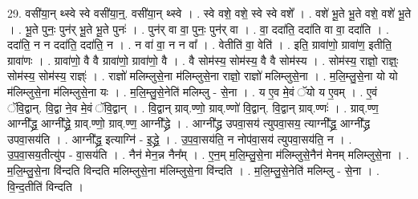 \documentclass[17pt]{extarticle}
\begin{document}
29. वसी॑या॒न् थ्स्वे स्वे वसी॑या॒न्॒. वसी॑या॒न् थ्स्वे । . स्वे वशे॒ वशे॒ स्वे स्वे वशे᳚ । . वशे॑ भू॒ते भू॒ते वशे॒ वशे॑ भू॒ते । . भू॒ते पुनः॒ पुन॑र् भू॒ते भू॒ते पुनः॑ । . पुन॑र् वा वा॒ पुनः॒ पुन॑र् वा । . वा॒ ददा॑ति॒ ददा॑ति वा वा॒ ददा॑ति । . ददा॑ति॒ न न ददा॑ति॒ ददा॑ति॒ न । . न वा॑ वा॒ न न वा᳚ । . वेतीति॑ वा॒ वेति॑ । . इति॒ ग्रावा॑णो॒ ग्रावा॑ण॒ इतीति॒ ग्रावा॑णः । . ग्रावा॑णो॒ वै वै ग्रावा॑णो॒ ग्रावा॑णो॒ वै । . वै सोम॑स्य॒ सोम॑स्य॒ वै वै सोम॑स्य । . सोम॑स्य॒ राज्ञो॒ राज्ञ्ः॒ सोम॑स्य॒ सोम॑स्य॒ राज्ञ्ः॑ । . राज्ञो॑ मलिम्लुसे॒ना म॑लिम्लुसे॒ना राज्ञो॒ राज्ञो॑ मलिम्लुसे॒ना । . म॒लि॒म्लु॒से॒ना यो यो म॑लिम्लुसे॒ना म॑लिम्लुसे॒ना यः । . म॒लि॒म्लु॒से॒नेति॑ मलिम्लु - से॒ना । . य ए॒व मे॒वं ॅयो य ए॒वम् । . ए॒वं ॅवि॒द्वान्. वि॒द्वा ने॒व मे॒वं ॅवि॒द्वान् । . वि॒द्वान् ग्राव्.ण्णो॒ ग्राव्.ण्णो॑ वि॒द्वान्. वि॒द्वान् ग्राव्.ण्णः॑ । . ग्राव्.ण्ण॒ आग्नी᳚द्ध्र॒ आग्नी᳚द्ध्रे॒ ग्राव्.ण्णो॒ ग्राव्.ण्ण॒ आग्नी᳚द्ध्रे । . आग्नी᳚द्ध्र उपवा॒सय॑ त्युपवा॒सय॒ त्याग्नी᳚द्ध्र॒ आग्नी᳚द्ध्र उपवा॒सय॑ति । . आग्नी᳚द्ध्र॒ इत्याग्नि॑ - इ॒द्ध्रे॒ । . उ॒प॒वा॒सय॑ति॒ न नोप॑वा॒सय॑ त्युपवा॒सय॑ति॒ न । . उ॒प॒वा॒सय॒तीत्यु॑प - वा॒सय॑ति । . नैन॑ मेन॒न्न नैन᳚म् । . ए॒न॒म् म॒लि॒म्लु॒से॒ना म॑लिम्लुसे॒नैन॑ मेनम् मलिम्लुसे॒ना । . म॒लि॒म्लु॒से॒ना वि॑न्दति विन्दति मलिम्लुसे॒ना म॑लिम्लुसे॒ना वि॑न्दति । . म॒लि॒म्लु॒से॒नेति॑ मलिम्लु - से॒ना । . वि॒न्द॒तीति॑ विन्दति । \newline
\end{document}
